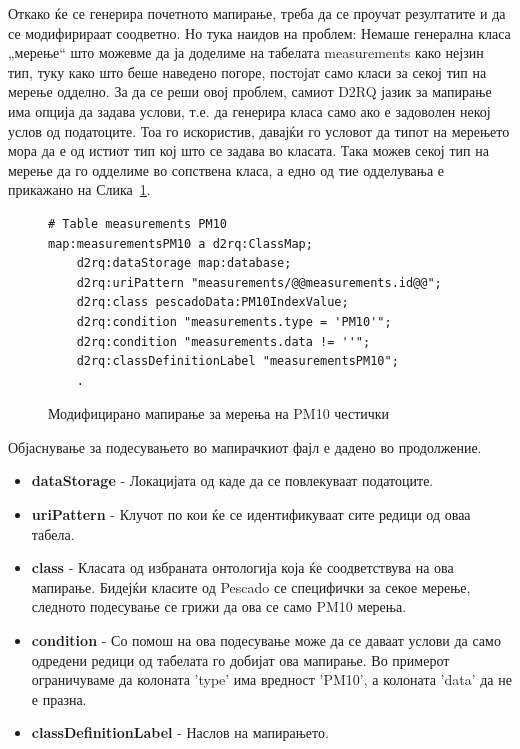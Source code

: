 \documentclass{uvamscse}
\begin{document}
Откако ќе се генерира почетното мапирање, треба да се проучат резултатите и да се модифирираат соодветно. Но тука наидов на проблем: Немаше генерална класа „мерење“ што можевме да ја доделиме на табелата measurements како нејзин тип, туку како што беше наведено погоре, постојат само класи за секој тип на мерење одделно. За да се реши овој проблем, самиот D2RQ јазик за мапирање има опција да задава услови, т.е. да генерира класа само ако е задоволен некој услов од податоците. Тоа го искористив, давајќи го условот да типот на мерењето мора да е од истиот тип кој што се задава во класата. Така можев секој тип на мерење да го одделиме во сопствена класа, а едно од тие одделувања е прикажано на Слика~\ref{fig:pm10merenje}.

\begin{figure}[H]
\centering
\begin{snippet}
\begin{verbatim}
# Table measurements PM10
map:measurementsPM10 a d2rq:ClassMap;
	d2rq:dataStorage map:database;
	d2rq:uriPattern "measurements/@@measurements.id@@";
	d2rq:class pescadoData:PM10IndexValue;		
    d2rq:condition "measurements.type = 'PM10'";
    d2rq:condition "measurements.data != ''";
	d2rq:classDefinitionLabel "measurementsPM10";
	.
\end{verbatim}
\end{snippet}
\caption{Модифицирано мапирање за мерења на PM10 честички}
\label{fig:pm10merenje}
\end{figure}

Објаснување за подесувањето во мапирачкиот фајл е дадено во продолжение.

\begin{itemize}
\item \textbf{dataStorage} - Локацијата од каде да се повлекуваат податоците.
\item \textbf{uriPattern} - Клучот по кои ќе се идентификуваат сите редици од оваа табела.
\item \textbf{class} - Класата од избраната онтологија која ќе соодветствува на ова мапирање. Бидејќи класите од Pescado се специфички за секое мерење, следното подесување се грижи да ова се само PM10 мерења.
\item \textbf{condition} - Со помош на ова подесување може да се даваат услови да само одредени редици од табелата го добијат ова мапирање. Во примерот ограничуваме да колоната 'type' има вредност 'PM10', а колоната 'data' да не е празна.
\item \textbf{classDefinitionLabel} - Наслов на мапирањето.

\end{itemize}
\end{document}
